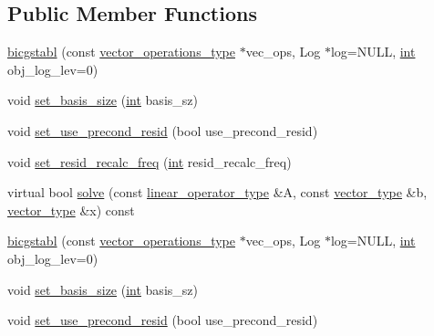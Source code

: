 \subsection*{Public Member Functions}
\begin{DoxyCompactItemize}
\item 
\hyperlink{classnumerical__algos_1_1lin__solvers_1_1bicgstabl_ab11c8e6fd2099e7b2c7906b8423572b0}{bicgstabl} (const \hyperlink{classnumerical__algos_1_1lin__solvers_1_1bicgstabl_a10544b2c65e7fcf5ff71a3049c19734c}{vector\-\_\-operations\-\_\-type} $\ast$vec\-\_\-ops, Log $\ast$log=N\-U\-L\-L, \hyperlink{classint}{int} obj\-\_\-log\-\_\-lev=0)
\item 
void \hyperlink{classnumerical__algos_1_1lin__solvers_1_1bicgstabl_a358188c0202233c9330fe6a0ec6a8440}{set\-\_\-basis\-\_\-size} (\hyperlink{classint}{int} basis\-\_\-sz)
\item 
void \hyperlink{classnumerical__algos_1_1lin__solvers_1_1bicgstabl_ab420850c21b5e6a86cd41491e309cb56}{set\-\_\-use\-\_\-precond\-\_\-resid} (bool use\-\_\-precond\-\_\-resid)
\item 
void \hyperlink{classnumerical__algos_1_1lin__solvers_1_1bicgstabl_a447c4cc465306db85a804c0e6b2773f4}{set\-\_\-resid\-\_\-recalc\-\_\-freq} (\hyperlink{classint}{int} resid\-\_\-recalc\-\_\-freq)
\item 
virtual bool \hyperlink{classnumerical__algos_1_1lin__solvers_1_1bicgstabl_a2dd4f6cdd207b1a77aa94831fbdf9839}{solve} (const \hyperlink{classnumerical__algos_1_1lin__solvers_1_1bicgstabl_a01e654bee784fc6e5fae7b02dd408523}{linear\-\_\-operator\-\_\-type} \&A, const \hyperlink{classnumerical__algos_1_1lin__solvers_1_1bicgstabl_add3b80f2998237878d4cbe24478bcf53}{vector\-\_\-type} \&b, \hyperlink{classnumerical__algos_1_1lin__solvers_1_1bicgstabl_add3b80f2998237878d4cbe24478bcf53}{vector\-\_\-type} \&x) const 
\item 
\hyperlink{classnumerical__algos_1_1lin__solvers_1_1bicgstabl_ab11c8e6fd2099e7b2c7906b8423572b0}{bicgstabl} (const \hyperlink{classnumerical__algos_1_1lin__solvers_1_1bicgstabl_a10544b2c65e7fcf5ff71a3049c19734c}{vector\-\_\-operations\-\_\-type} $\ast$vec\-\_\-ops, Log $\ast$log=N\-U\-L\-L, \hyperlink{classint}{int} obj\-\_\-log\-\_\-lev=0)
\item 
void \hyperlink{classnumerical__algos_1_1lin__solvers_1_1bicgstabl_a358188c0202233c9330fe6a0ec6a8440}{set\-\_\-basis\-\_\-size} (\hyperlink{classint}{int} basis\-\_\-sz)
\item 
void \hyperlink{classnumerical__algos_1_1lin__solvers_1_1bicgstabl_ab420850c21b5e6a86cd41491e309cb56}{set\-\_\-use\-\_\-precond\-\_\-resid} (bool use\-\_\-precond\-\_\-resid)

\end{DoxyCompactItemize}
